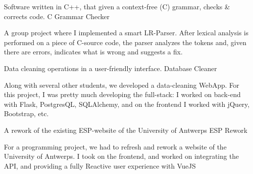 
\begin{cventries}
  \cventry
    {Software written in C++, that given a context-free (C) grammar, checks \& corrects code.} %
    {C Grammar Checker} %
    {} %
    {} %
    {
    \begin{cvitems} %
        \item {A group project where I implemented a smart LR-Parser. After lexical analysis is performed on a piece of C-source code, the parser analyzes the tokens and, given there are errors, indicates what is wrong and suggests a fix. }
     \end{cvitems}
    }

  \cventry
    {Data cleaning operations in a user-friendly interface.} %
    {Database Cleaner} %
    {} %
    {} %
    {
    \begin{cvitems} %
        \item {Along with several other students, we developed a data-cleaning WebApp. For this project, I was pretty much developing the full-stack: I worked on back-end with Flask, PostgresQL, SQLAlchemy, and on the frontend I worked with jQuery, Bootstrap, etc. }
    \end{cvitems}
    }
    
  \cventry
    {A rework of the existing ESP-website of the University of Antwerps} %
    {ESP Rework} %
    {} %
    {} %
    {
    \begin{cvitems} %
      	\item {For a programming project, we had to refresh and rework a website of the University of Antwerps. I took on the frontend, and worked on integrating the API, and providing a fully Reactive user experience with VueJS }
    \end{cvitems}
    }
\end{cventries}